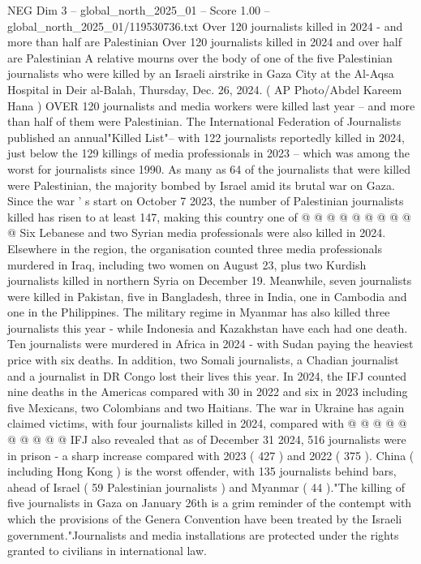 \begin{textsample}{NEG Dim 3 – global\_north\_2025\_01 – Score 1.00 – global\_north\_2025\_01/119530736.txt}  \label{ex:f3_neg_218}
Over 120 journalists killed in 2024 - and more than half are Palestinian Over 120 journalists killed in 2024 and over half are Palestinian A relative mourns over the body of one of the five Palestinian journalists who were killed by an Israeli airstrike in Gaza City at the Al-Aqsa Hospital in Deir al-Balah, Thursday, Dec. 26, 2024. ( AP Photo/Abdel Kareem Hana ) OVER 120 journalists and media workers were killed last year -- and more than half of them were Palestinian.
The International Federation of Journalists published an annual"Killed List"-- with 122 journalists reportedly killed in 2024, just below the 129 killings of media professionals in 2023 -- which was among the worst for journalists since 1990.
As many as 64 of the journalists that were killed were Palestinian, the majority bombed by Israel amid its brutal war on Gaza.
Since the war ' s start on October 7 2023, the number of Palestinian journalists killed has risen to at least 147, making this country one of @ @ @ @ @ @ @ @ @ @ Six Lebanese and two Syrian media professionals were also killed in 2024.
Elsewhere in the region, the organisation counted three media professionals murdered in Iraq, including two women on August 23, plus two Kurdish journalists killed in northern Syria on December 19.
Meanwhile, seven journalists were killed in Pakistan, five in Bangladesh, three in India, one in Cambodia and one in the Philippines.
The military regime in Myanmar has also killed three journalists this year - while Indonesia and Kazakhstan have each had one death.
Ten journalists were murdered in Africa in 2024 - with Sudan paying the heaviest price with six deaths.
In addition, two Somali journalists, a Chadian journalist and a journalist in DR Congo lost their lives this year.
In 2024, the IFJ counted nine deaths in the Americas compared with 30 in 2022 and six in 2023 including five Mexicans, two Colombians and two Haitians.
The war in Ukraine has again claimed victims, with four journalists killed in 2024, compared with @ @ @ @ @ @ @ @ @ @ IFJ also revealed that as of December 31 2024, 516 journalists were in prison - a sharp increase compared with 2023 ( 427 ) and 2022 ( 375 ).
China ( including Hong Kong ) is the worst offender, with 135 journalists behind bars, ahead of Israel ( 59 Palestinian journalists ) and Myanmar ( 44 )."The killing of five journalists in Gaza on January 26th is a grim reminder of the contempt with which the provisions of the Genera Convention have been treated by the Israeli government."Journalists and media installations are protected under the rights granted to civilians in international law.

\end{textsample}

